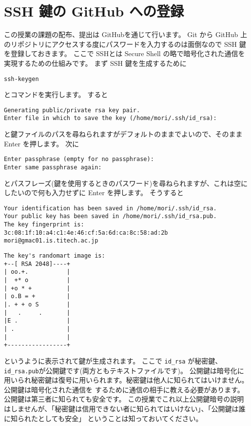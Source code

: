 \documentclass[a4paper,11pt, article]{memoir}
\begin{document}
\section{SSH 鍵の GitHub への登録}
この授業の課題の配布、提出は GitHubを通じて行います。
Git から GitHub 上のリポジトリにアクセスする度にパスワードを入力するのは面倒なので SSH 鍵を登録しておきます。
ここで SSHとは Secure Shell の略で暗号化された通信を実現するための仕組みです。
まず SSH 鍵を生成するために
\begin{verbatim}
ssh-keygen
\end{verbatim}
とコマンドを実行します。
すると
\begin{verbatim}
Generating public/private rsa key pair.
Enter file in which to save the key (/home/mori/.ssh/id_rsa): 
\end{verbatim}
と鍵ファイルのパスを尋ねられますがデフォルトのままでよいので、そのまま Enter を押します。
次に
\begin{verbatim}
Enter passphrase (empty for no passphrase): 
Enter same passphrase again: 
\end{verbatim}
とパスフレーズ(鍵を使用するときのパスワード)を尋ねられますが、これは空にしたいので何も入力せずに Enter を押します。
そうすると
\begin{verbatim}
Your identification has been saved in /home/mori/.ssh/id_rsa.
Your public key has been saved in /home/mori/.ssh/id_rsa.pub.
The key fingerprint is:
3c:08:1f:10:a4:c1:4e:46:cf:5a:6d:ca:8c:58:ad:2b mori@gmac01.is.titech.ac.jp
\end{verbatim}
\begin{verbatim}
The key's randomart image is:
+--[ RSA 2048]----+
| oo.+.           |
|  +* o           |
| +o * +          |
| o.B = +         |
|. + + o S        |
|   .     .       |
|E .              |
| .               |
|                 |
+-----------------+
\end{verbatim}
というように表示されて鍵が生成されます。
ここで \texttt{id\_rsa} が秘密鍵、\texttt{id\_rsa.pub}が公開鍵です(両方ともテキストファイルです)。
公開鍵は暗号化に用いられ秘密鍵は復号に用いられます。秘密鍵は他人に知られてはいけません。公開鍵は暗号化された通信を
するために通信の相手に教える必要があります。公開鍵は第三者に知られても安全です。
この授業でこれ以上公開鍵暗号の説明はしませんが、「秘密鍵は信用できない者に知られてはいけない」、「公開鍵は誰に知られたとしても安全」
ということは知っておいてください。
\end{document}
